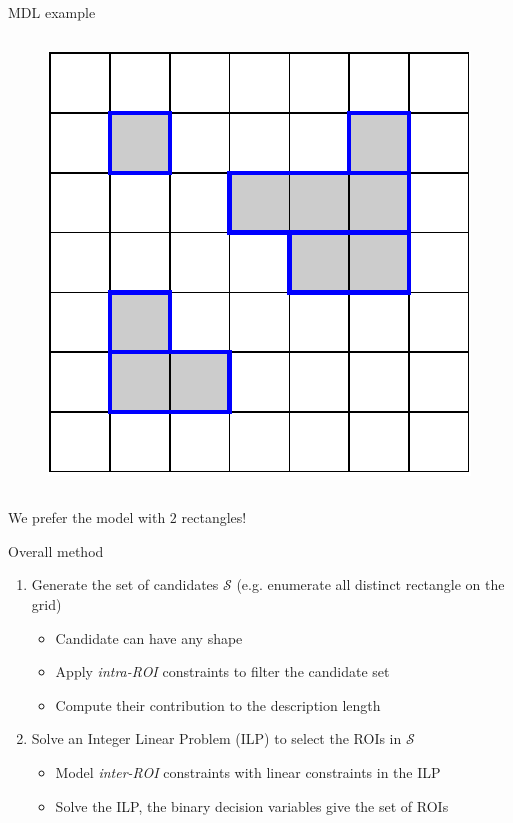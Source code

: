 \documentclass[10pt]{beamer}
\begin{document}
\begin{frame}{MDL example}
\begin{columns}[T, onlytextwidth]
        \begin{figure}
            \centering
            \includegraphics[scale=0.5]{figures/running-example/MDL/example-model-complex.pdf}
        \end{figure}
    \end{columns}

    \centering
    We prefer the model with $2$ rectangles!
\end{frame}


\begin{frame}{Overall method}
    \begin{enumerate}
        \item Generate the set of candidates $\mathcal{S}$ (e.g. enumerate all distinct
            rectangle on the grid)
            \begin{itemize}
                \item Candidate can have any shape
                \item Apply \emph{intra-ROI} constraints to filter the candidate set
                \item Compute their contribution to the description length
            \end{itemize}
        \item Solve an Integer Linear Problem (ILP) to select the ROIs in $\mathcal{S}$
            \begin{itemize}
                \item Model \emph{inter-ROI} constraints with linear constraints in the ILP
                \item Solve the ILP, the binary decision variables give the set of ROIs
            \end{itemize}
    \end{enumerate}

\end{frame}
\end{document}
